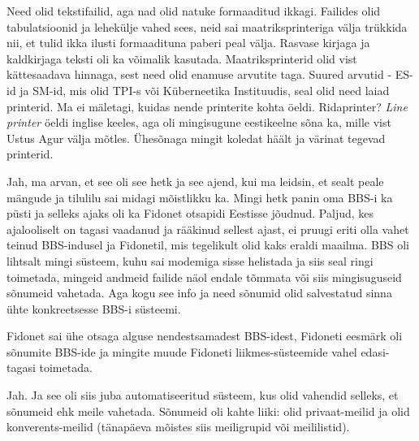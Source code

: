 
Need olid tekstifailid, aga nad olid natuke formaaditud ikkagi. Failides olid 
tabulatsioonid ja lehekülje vahed  sees, neid sai maatriksprinteriga välja 
trükkida nii, et tulid ikka ilusti formaadituna paberi peal välja. Rasvase kirjaga
ja kaldkirjaga teksti oli ka võimalik kasutada.
Maatriksprinterid olid vist kättesaadava hinnaga, sest need olid enamuse arvutite taga. 
 Suured arvutid - ES-id ja SM-id, mis olid TPI-s või Küberneetika 
Instituudis, seal olid need laiad printerid. Ma ei mäletagi, kuidas nende 
printerite kohta öeldi. Ridaprinter? \emph{Line printer} öeldi inglise keeles, 
aga  oli mingisugune eestikeelne sõna ka, mille vist Ustus Agur välja mõtles. Ühesõnaga mingit koledat häält ja värinat tegevad 
printerid.


Jah, ma arvan, et see oli see hetk ja see ajend, kui ma leidsin, et sealt  
peale mängude ja  tilulilu sai midagi mõistlikku ka. Mingi hetk panin oma BBS-i 
ka püsti ja selleks ajaks oli ka Fidonet otsapidi Eestisse 
jõudnud. Paljud, kes  ajalooliselt on tagasi vaadanud ja rääkinud 
sellest ajast, ei pruugi eriti olla vahet teinud BBS-indusel ja Fidonetil,  mis 
tegelikult  olid kaks eraldi maailma. BBS oli lihtsalt mingi 
süsteem, kuhu sai modemiga sisse helistada ja siis seal ringi toimetada,  
mingeid andmeid failide näol endale tõmmata või siis mingisuguseid sõnumeid 
vahetada. Aga kogu see info ja need sõnumid olid salvestatud sinna ühte 
konkreetsesse BBS-i süsteemi.

Fidonet sai ühe otsaga  alguse nendestsamadest BBS-idest, Fidoneti eesmärk 
oli sõnumite BBS-ide ja mingite muude Fidoneti liikmes-süsteemide vahel 
edasi-tagasi toimetada. 


Jah. Ja see oli siis juba automatiseeritud süsteem, kus olid vahendid 
selleks, et sõnumeid ehk  meile vahetada. Sõnumeid oli kahte liiki: olid 
privaat-meilid ja olid konverents-meilid (tänapäeva mõistes siis
meiligrupid või meililistid).

